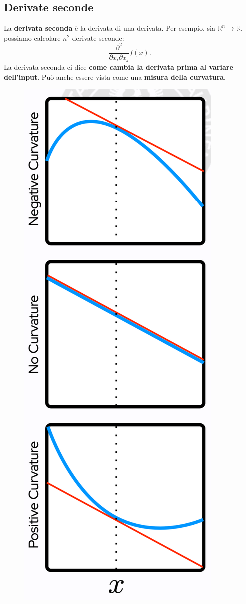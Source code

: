 \subsection{Derivate seconde}
La \textbf{derivata seconda} è la derivata di una derivata. Per esempio, sia $\mathbb{R}^n\rightarrow \mathbb{R}$, possiamo calcolare $n^2$ derivate seconde:
\begin{equation}
    \frac{\partial^2}{\partial x_i\partial x_j}f(x).
\end{equation}
La derivata seconda ci dice \textbf{come cambia la derivata prima al variare dell'input}. Può anche essere vista come una \textbf{misura della curvatura}.
\begin{figure}[!h]
    \includegraphics[scale=.55]{images/prerequisites/secondDerivative.png}
    \centering
\end{figure}



